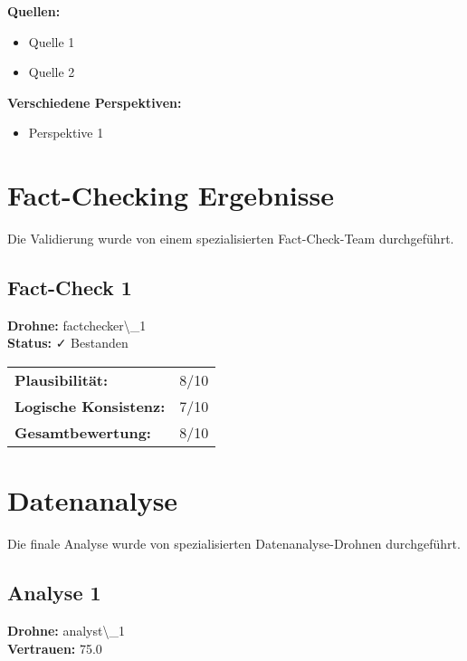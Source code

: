 \documentclass[12pt,a4paper]{article}
\begin{document}
\textbf{Quellen:}
\begin{itemize}
\item Quelle 1
\item Quelle 2
\end{itemize}

\textbf{Verschiedene Perspektiven:}
\begin{itemize}
\item Perspektive 1
\end{itemize}


\newpage
\section{Fact-Checking Ergebnisse}

Die Validierung wurde von einem spezialisierten Fact-Check-Team durchgeführt.


\subsection{Fact-Check 1}

\textbf{Drohne:} factchecker\textbackslash{}_1\\
\textbf{Status:} ✓ Bestanden\\

\begin{tabular}{ll}
\textbf{Plausibilität:} & 8/10 \\
\textbf{Logische Konsistenz:} & 7/10 \\
\textbf{Gesamtbewertung:} & 8/10 \\
\end{tabular}


\newpage
\section{Datenanalyse}

Die finale Analyse wurde von spezialisierten Datenanalyse-Drohnen durchgeführt.

\subsection{Analyse 1}

\textbf{Drohne:} analyst\textbackslash{}_1\\
\textbf{Vertrauen:} 75.0%
\end{document}
